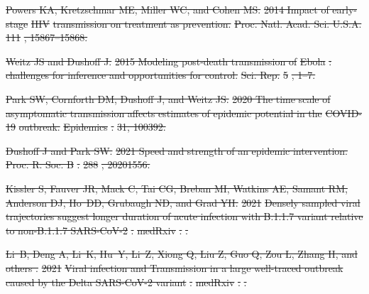 \documentclass[12pt]{article}
\providecommand{\DIFdeltex}[1]{{\protect\color{red}\sout{#1}}}                      %
\providecommand{\DIFdel}[1]{\texorpdfstring{\DIFdeltex{#1}}{}} %
\begin{document}
\DIFdel{Powers KA, Kretzschmar ME, Miller WC, and Cohen MS.
}%
\DIFdel{2014 Impact of early-stage }%
\DIFdel{HIV}%
\DIFdel{transmission on treatment as
  prevention.
}%
\DIFdel{Proc. Natl. Acad. Sci. U.S.A.}%
\DIFdel{111}%
\DIFdel{, 15867--15868.
}%

\DIFdel{Weitz JS and Dushoff J.
}%
\DIFdel{2015 Modeling post-death transmission of }%
\DIFdel{Ebola}%
\DIFdel{: challenges for
  inference and opportunities for control.
}%
\DIFdel{Sci. Rep.}%
\DIFdel{5}%
\DIFdel{, 1--7.
}%

\DIFdel{Park SW, Cornforth DM, Dushoff J, and Weitz JS.
}%
\DIFdel{2020 The time scale of asymptomatic transmission affects estimates of
  epidemic potential in the }%
\DIFdel{COVID-19}%
\DIFdel{outbreak.
}%
\DIFdel{Epidemics}%
\DIFdel{.
}%
\DIFdel{31, 100392.
}%

\DIFdel{Dushoff J and Park SW.
}%
\DIFdel{2021 Speed and strength of an epidemic intervention.
}%
\DIFdel{Proc. R. Soc. B}%
\DIFdel{.
}%
\DIFdel{288}%
\DIFdel{, 20201556.
}%

\DIFdel{Kissler S, Fauver JR, Mack C, Tai CG, Breban MI, Watkins AE, Samant RM,
  Anderson DJ, Ho~DD, Grubaugh ND, and Grad YH.
}%
\DIFdel{2021 }%
\DIFdel{Densely sampled viral trajectories suggest longer duration of
  acute infection with B.1.1.7 variant relative to non-B.1.1.7 SARS-CoV-2}%
\DIFdel{.
}%
\DIFdel{medRxiv}%
\DIFdel{.
}%
\DIFdel{.
}%

\DIFdel{Li~B, Deng A, Li~K, Hu~Y, Li~Z, Xiong Q, Liu Z, Guo Q, Zou L, Zhang H, and
  others .
}%
\DIFdel{2021 }%
\DIFdel{Viral infection and Transmission in a large well-traced
  outbreak caused by the Delta SARS-CoV-2 variant}%
\DIFdel{.
}%
\DIFdel{medRxiv}%
\DIFdel{.
}%
\DIFdel{.
}%
\end{document}
